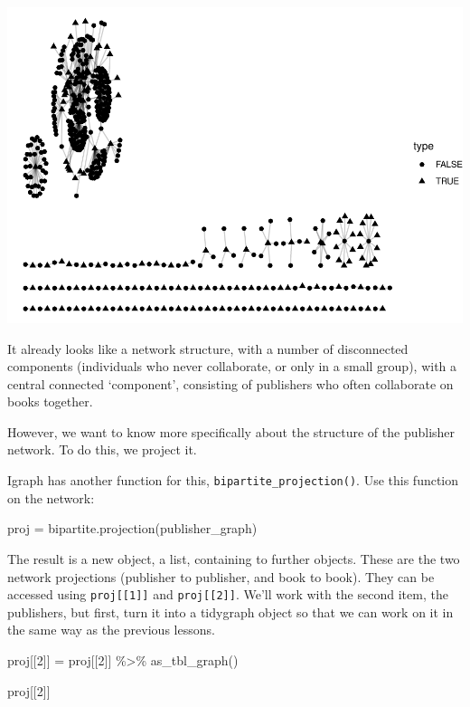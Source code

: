 \documentclass[
]{book}
\newenvironment{Shaded}{\begin{snugshade}}{\end{snugshade}}
\newcommand{\DecValTok}[1]{\textcolor[rgb]{0.00,0.00,0.81}{#1}}
\newcommand{\FunctionTok}[1]{\textcolor[rgb]{0.00,0.00,0.00}{#1}}
\newcommand{\NormalTok}[1]{#1}
\newcommand{\OtherTok}[1]{\textcolor[rgb]{0.56,0.35,0.01}{#1}}
\newcommand{\SpecialCharTok}[1]{\textcolor[rgb]{0.00,0.00,0.00}{#1}}
\begin{document}
\includegraphics{_main_files/figure-latex/unnamed-chunk-76-1.pdf}

It already looks like a network structure, with a number of disconnected components (individuals who never collaborate, or only in a small group), with a central connected `component', consisting of publishers who often collaborate on books together.

However, we want to know more specifically about the structure of the publisher network. To do this, we project it.

Igraph has another function for this, \texttt{bipartite\_projection()}. Use this function on the network:

\begin{Shaded}
\begin{Highlighting}[]
\NormalTok{proj }\OtherTok{=} \FunctionTok{bipartite.projection}\NormalTok{(publisher\_graph)}
\end{Highlighting}
\end{Shaded}

The result is a new object, a list, containing to further objects. These are the two network projections (publisher to publisher, and book to book). They can be accessed using \texttt{proj{[}{[}1{]}{]}} and \texttt{proj{[}{[}2{]}{]}}. We'll work with the second item, the publishers, but first, turn it into a tidygraph object so that we can work on it in the same way as the previous lessons.

\begin{Shaded}
\begin{Highlighting}[]
\NormalTok{proj[[}\DecValTok{2}\NormalTok{]] }\OtherTok{=}\NormalTok{ proj[[}\DecValTok{2}\NormalTok{]] }\SpecialCharTok{\%\textgreater{}\%} \FunctionTok{as\_tbl\_graph}\NormalTok{()}

\NormalTok{proj[[}\DecValTok{2}\NormalTok{]] }
\end{Highlighting}
\end{Shaded}
\end{document}
